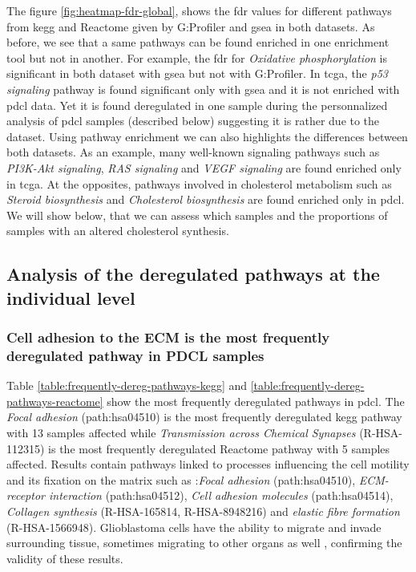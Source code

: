 The figure \ref*{fig:heatmap-fdr-global}, shows the \acrshort{fdr} values for different pathways from \acrshort{kegg} and Reactome given by G:Profiler and \acrshort{gsea} in both datasets.
As before, we see that a same pathways can be found enriched in one enrichment tool but not in another.
For example, the \acrshort{fdr} for \textit{Oxidative phosphorylation} is significant in both dataset with \acrshort{gsea} but not with G:Profiler.
In \acrshort{tcga}, the \textit{p53 signaling} pathway is found significant only with \acrshort{gsea} and it is not enriched with \acrshort{pdcl} data.
Yet it is found deregulated in one sample during the personnalized analysis of \acrshort{pdcl} samples (described below) suggesting it is rather due to the dataset.
Using pathway enrichment we can also highlights the differences between both datasets.
As an example, many well-known signaling pathways such as \textit{PI3K-Akt signaling}, \textit{RAS signaling} and \textit{VEGF signaling} are found enriched only in \acrshort{tcga}.
At the opposites, pathways involved in cholesterol metabolism such as \textit{Steroid biosynthesis} and \textit{Cholesterol biosynthesis} are found enriched only in \acrshort{pdcl}.
We will show below, that we can assess which samples and the proportions of samples with an altered cholesterol synthesis.

\subsection{Analysis of the deregulated pathways at the individual level}

\subsubsection{Cell adhesion to the ECM is the most frequently deregulated pathway in PDCL samples}

Table \ref*{table:frequently-dereg-pathways-kegg} and \ref*{table:frequently-dereg-pathways-reactome} show the most frequently deregulated pathways in \acrshort{pdcl}.
The \textit{Focal adhesion} (path:hsa04510) is the most frequently deregulated \acrshort{kegg} pathway with 13 samples affected while \textit{Transmission across Chemical Synapses} (R-HSA-112315) is the most frequently deregulated Reactome pathway with 5 samples affected.
Results contain pathways linked to processes influencing the cell motility and its fixation on the matrix such as :\textit{Focal adhesion} (path:hsa04510), \textit{ECM-receptor interaction} (path:hsa04512), \textit{Cell adhesion molecules} (path:hsa04514), \textit{Collagen synthesis} (R-HSA-165814, R-HSA-8948216) and \textit{elastic fibre formation} (R-HSA-1566948).
Glioblastoma cells have the ability to migrate and invade surrounding tissue, sometimes migrating to other organs as well \cite*{Lah2020}, confirming the validity of these results.

